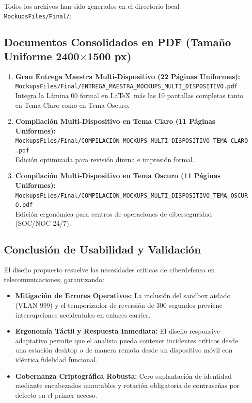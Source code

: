 \documentclass[11pt,a4paper]{article}
\begin{document}
Todos los archivos han sido generados en el directorio local \texttt{MockupsFiles/Final/}:

\subsection{Documentos Consolidados en PDF (Tamaño Uniforme 2400$\times$1500 px)}
\begin{enumerate}[leftmargin=18bp, itemsep=6bp]
    \item \textbf{Gran Entrega Maestra Multi-Dispositivo (22 Páginas Uniformes):}\\
    \texttt{MockupsFiles/Final/ENTREGA\_MAESTRA\_MOCKUPS\_MULTI\_DISPOSITIVO.pdf}\\
    Integra la Lámina 00 formal en \LaTeX\ más las 10 pantallas completas tanto en Tema Claro como en Tema Oscuro.
    
    \item \textbf{Compilación Multi-Dispositivo en Tema Claro (11 Páginas Uniformes):}\\
    \texttt{MockupsFiles/Final/COMPILACION\_MOCKUPS\_MULTI\_DISPOSITIVO\_TEMA\_CLARO.pdf}\\
    Edición optimizada para revisión diurna e impresión formal.
    
    \item \textbf{Compilación Multi-Dispositivo en Tema Oscuro (11 Páginas Uniformes):}\\
    \texttt{MockupsFiles/Final/COMPILACION\_MOCKUPS\_MULTI\_DISPOSITIVO\_TEMA\_OSCURO.pdf}\\
    Edición ergonómica para centros de operaciones de ciberseguridad (SOC/NOC 24/7).
\end{enumerate}

\subsection{Conclusión de Usabilidad y Validación}
El diseño propuesto resuelve las necesidades críticas de ciberdefensa en telecomunicaciones, garantizando:
\begin{itemize}[itemsep=2bp]
    \item \textbf{Mitigación de Errores Operativos:} La inclusión del sandbox aislado (VLAN 999) y el temporizador de reversión de 300 segundos previene interrupciones accidentales en enlaces carrier.
    \item \textbf{Ergonomía Táctil y Respuesta Inmediata:} El diseño responsive adaptativo permite que el analista pueda contener incidentes críticos desde una estación desktop o de manera remota desde un dispositivo móvil con idéntica fidelidad funcional.
    \item \textbf{Gobernanza Criptográfica Robusta:} Cero suplantación de identidad mediante encabezados inmutables y rotación obligatoria de contraseñas por defecto en el primer acceso.
\end{itemize}
\end{document}
